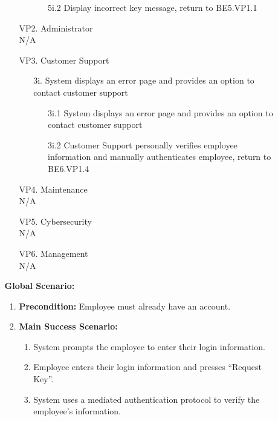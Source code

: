 \documentclass[]{article}
\begin{document}
\begin{enumerate}[{\bf BE1.}]
\begin{enumerate}[{\bf BE5.}]
\begin{enumerate}
\begin{enumerate}
\begin{enumerate}
                        \item[5i.2] Display incorrect key message, return to BE5.VP1.1 
                    \end{enumerate}
                \end{enumerate}
            \item[VP2.] Administrator \\
            \indent N/A 
            \item[VP3.] Customer Support \\
            \begin{enumerate}
                \item[3i.] System displays an error page and provides an option to contact customer support
                \begin{enumerate}
                    \item[3i.1] System displays an error page and provides an option to contact customer support
                    \item[3i.2] Customer Support personally verifies employee information and manually authenticates employee, return to BE6.VP1.4
                \end{enumerate}
            \end{enumerate}
            \item[VP4.] Maintenance \\
            \indent N/A 
            \item[VP5.] Cybersecurity \\
            \indent N/A 
            \item[VP6.] Management \\
            \indent N/A 
        \end{enumerate}
        {\bf Global Scenario:}\\
        \begin{enumerate}
            \item \textbf{Precondition:} Employee must already have an account.
            \item \textbf{Main Success Scenario:}
            \begin{enumerate}
                \item System prompts the employee to enter their login information.  
                \item Employee enters their login information and presses “Request Key”.  
                \item System uses a mediated authentication protocol to verify the employee’s information. 

\end{enumerate}
\end{enumerate}
\end{enumerate}
\end{enumerate}
\end{document}
